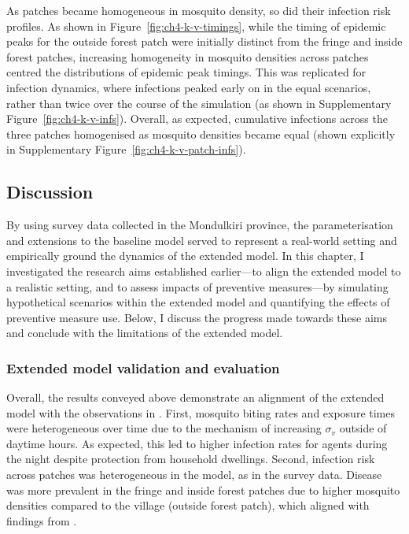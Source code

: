 As patches became homogeneous in mosquito density, so did their infection risk profiles. As shown in Figure~\ref{fig:ch4-k-v-timings}, while the timing of epidemic peaks for the outside forest patch were initially distinct from the fringe and inside forest patches, increasing homogeneity in mosquito densities across patches centred the distributions of epidemic peak timings. This was replicated for infection dynamics, where infections peaked early on in the equal scenarios, rather than twice over the course of the simulation (as shown in Supplementary Figure~\ref{fig:ch4-k-v-infs}). Overall, as expected, cumulative infections across the three patches homogenised as mosquito densities became equal (shown explicitly in Supplementary Figure~\ref{fig:ch4-k-v-patch-infs}).


\subsection{Discussion}\label{sec:extended-model-discussion}

By using survey data collected in the Mondulkiri province, the parameterisation and extensions to the baseline model served to represent a real-world setting and empirically ground the dynamics of the extended model. In this chapter, I investigated the research aims established earlier---to align the extended model to a realistic setting, and to assess impacts of preventive measures---by simulating hypothetical scenarios within the extended model and quantifying the effects of preventive measure use. Below, I discuss the progress made towards these aims and conclude with the limitations of the extended model.

\subsubsection{Extended model validation and evaluation}\label{sec:extended-model-validation-results}

Overall, the results conveyed above demonstrate an alignment of the extended model with the observations in \citet{sandfort_forest_2020, pepey_mobility_2022, vantaux_anopheles_2021}. First, mosquito biting rates and exposure times were heterogeneous over time due to the mechanism of increasing $\sigma_v$ outside of daytime hours. As expected, this led to higher infection rates for agents during the night despite protection from household dwellings. Second, infection risk across patches was heterogeneous in the model, as in the survey data. Disease was more prevalent in the fringe and inside forest patches due to higher mosquito densities compared to the village (outside forest patch), which aligned with findings from \citet{sandfort_forest_2020, vantaux_anopheles_2021}. 

